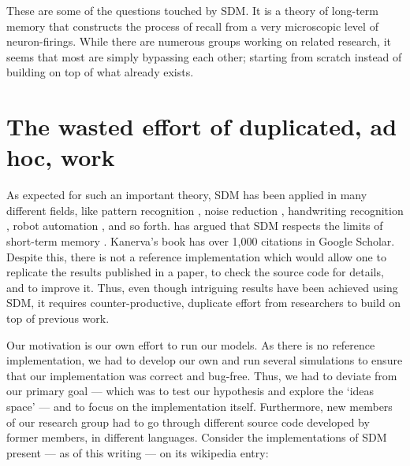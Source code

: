 These are some of the questions touched by SDM.  It is a theory of long-term memory that constructs the process of recall from a very microscopic level of neuron-firings. While there are numerous groups working on related research, it seems that most are simply bypassing each other; starting from scratch instead of building on top of what already exists.


\section{The wasted effort of duplicated, ad hoc, work}

As expected for such an important theory, SDM has been applied in many different fields, like pattern recognition \citep{norman2003modeling, rao1995natural}, noise reduction \citep{Meng2009}, handwriting recognition \citep{fan1997genetic}, robot automation \citep{Rajesh1998, mendes2008robot}, and so forth. \citet{Linhares2011} has argued that SDM respects the limits of short-term memory \citep{Miller1955, Cowan2001}. Kanerva's book has over 1,000 citations in Google Scholar.  Despite this, there is not a reference implementation which would allow one to replicate the results published in a paper, to check the source code for details, and to improve it. Thus, even though intriguing results have been achieved using SDM, it requires counter-productive, duplicate effort from researchers to build on top of previous work.

Our motivation is our own effort to run our models. As there is no reference implementation, we had to develop our own and run several simulations to ensure that our implementation was correct and bug-free. Thus, we had to deviate from our primary goal --- which was to test our hypothesis and explore the `ideas space' --- and to focus on the implementation itself. Furthermore, new members of our research group had to go through different source code developed by former members, in different languages.  Consider the implementations of SDM present --- as of this writing --- on its wikipedia entry\citep{noauthor_sparse_2018}:

